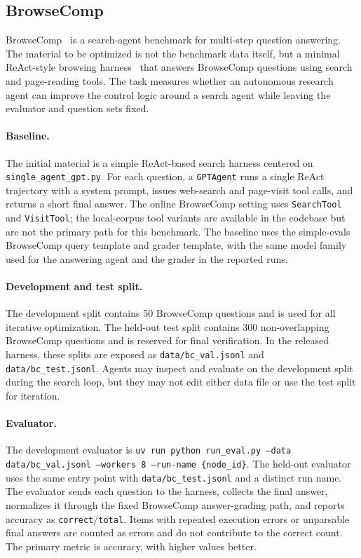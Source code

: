 \subsection{BrowseComp}
\label{app:benchmark-browsecomp}

BrowseComp~\citep{browsecomp} is a search-agent benchmark for
multi-step question answering.
The material to be optimized is not the benchmark data itself, but a minimal
ReAct-style browsing harness~\citep{react} that answers BrowseComp questions
using search and page-reading tools.
The task measures whether an autonomous research agent can improve the control
logic around a search agent while leaving the evaluator and question sets
fixed.

\paragraph{Baseline.}
The initial material is a simple ReAct-based search harness centered
on \texttt{single\_agent\_gpt.py}.
For each question, a \texttt{GPTAgent} runs a single ReAct trajectory with a
system prompt, issues web-search and page-visit tool calls, and returns a
short final answer.
The online BrowseComp setting uses \texttt{SearchTool} and \texttt{VisitTool};
the local-corpus tool variants are available in the codebase but are not the
primary path for this benchmark.
The baseline uses the simple-evals BrowseComp query template and grader
template, with the same model family used for the answering agent and the
grader in the reported runs.

\paragraph{Development and test split.}
The development split contains 50 BrowseComp questions and is used for all
iterative optimization.
The held-out test split contains 300 non-overlapping BrowseComp questions and
is reserved for final verification.
In the released harness, these splits are exposed as
\texttt{data/bc\_val.jsonl} and \texttt{data/bc\_test.jsonl}.
Agents may inspect and evaluate on the development split during the search
loop, but they may not edit either data file or use the test split for
iteration.

\paragraph{Evaluator.}
The development evaluator is
\texttt{uv run python run\_eval.py --data data/bc\_val.jsonl --workers 8 --run-name \{node\_id\}}.
The held-out evaluator uses the same entry point with
\texttt{data/bc\_test.jsonl} and a distinct run name.
The evaluator sends each question to the harness, collects the final answer,
normalizes it through the fixed BrowseComp answer-grading path, and reports
accuracy as \texttt{correct}/\texttt{total}.
Items with repeated execution errors or unparsable final answers are counted as
errors and do not contribute to the correct count.
The primary metric is accuracy, with higher values better.

